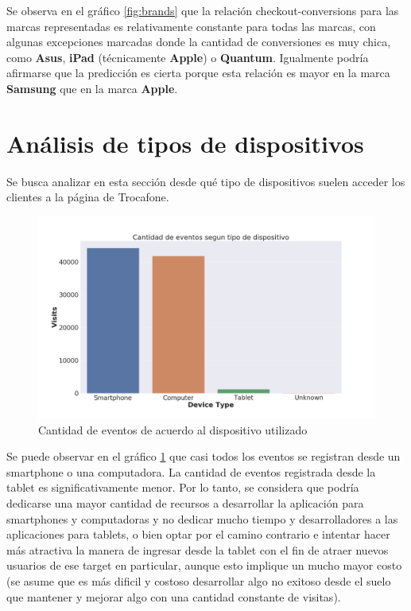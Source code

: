 \documentclass[a4paper]{article}
\begin{document}
Se observa en el gráfico \ref{fig:brands} que la relación checkout-conversions para las marcas representadas es relativamente constante para todas las marcas, con algunas excepciones marcadas donde la cantidad de conversiones es muy chica, como \textbf{Asus}, \textbf{iPad} (técnicamente \textbf{Apple}) o \textbf{Quantum}. Igualmente podría afirmarse que la predicción es cierta porque esta relación es mayor en la marca \textbf{Samsung} que en la marca \textbf{Apple}.

\section{Análisis de tipos de dispositivos}

Se busca analizar en esta sección desde qué tipo de dispositivos suelen acceder los clientes a la página de Trocafone.

\begin{figure}[h!]
	\includegraphics[width=\linewidth]{figures/150-eventos_tipo-barplot.png}
	\caption{Cantidad de eventos de acuerdo al dispositivo utilizado}
	\label{fig:dispositivos}
\end{figure}

Se puede observar en el gráfico \ref{fig:dispositivos} que casi todos los eventos se registran desde un smartphone o una computadora. La cantidad de eventos registrada desde la tablet es significativamente menor. Por lo tanto, se considera que podría dedicarse una mayor cantidad de recursos a desarrollar la aplicación para smartphones y computadoras y no dedicar mucho tiempo y desarrolladores a las aplicaciones para tablets, o bien optar por el camino contrario e intentar hacer más atractiva la manera de ingresar desde la tablet con el fin de atraer nuevos usuarios de ese target en particular, aunque esto implique un mucho mayor costo (se asume que es más dificil y costoso desarrollar algo no exitoso desde el suelo que mantener y mejorar algo con una cantidad constante de visitas).
\end{document}
